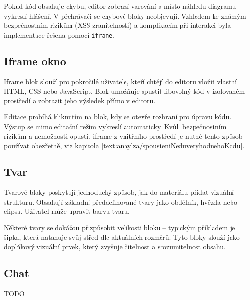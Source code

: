Pokud kód obsahuje chybu, editor zobrazí varování a místo náhledu diagramu vykreslí hlášení.
V přehrávači se chybové bloky neobjevují. 
Vzhledem ke známým bezpečnostním rizikům (XSS zranitelnosti) a komplikacím při interakci byla implementace řešena pomocí \texttt{iframe}.

\subsection{Iframe okno}

Iframe blok slouží pro pokročilé uživatele, kteří chtějí do editoru vložit vlastní HTML, CSS nebo JavaScript. 
Blok umožňuje spustit libovolný kód v izolovaném prostředí a zobrazit jeho výsledek přímo v editoru.

Editace probíhá kliknutím na blok, kdy se otevře rozhraní pro úpravu kódu. 
Výstup se mimo editační režim vykreslí automaticky. 
Kvůli bezpečnostním rizikům a nemožnosti opustit iframe z vnitřního prostředí je nutné tento způsob používat obezřetně, viz kapitola \ref{text:anaylza/spousteniNeduveryhodnehoKodu}.

\subsection{Tvar}

Tvarové bloky poskytují jednoduchý způsob, jak do materiálu přidat vizuální strukturu. 
Obsahují základní předdefinované tvary jako obdélník, hvězda nebo elipsa. Uživatel může upravit barvu tvaru.

Některé tvary se dokážou přizpůsobit velikosti bloku -- typickým příkladem je šipka, která natahuje svůj střed dle aktuálních rozměrů.
Tyto bloky slouží jako doplňkový vizuální prvek, který zvyšuje čitelnost a srozumitelnost obsahu.

\subsection{Chat}

TODO




